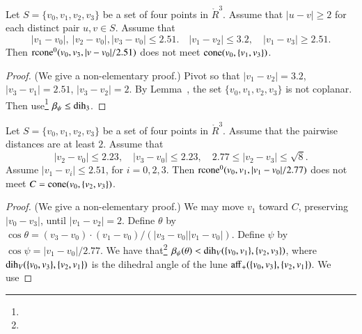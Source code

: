 \newpage

\begin{lemma}
 Let $S=\{v_0,v_1,v_2,v_3\}$ be a set of four points in $\ring{R}^3$.
Assume that $|u-v|\ge2$ for each distinct pair $u,v\in S$.  Assume
that 
  $$
    |v_1-v_0|,\ |v_2-v_0|, |v_3-v_0|\le 2.51.\quad 
    |v_1-v_2|\le 3.2,\quad |v_1-v_3|\ge 2.51.
   $$
Then ${\operatorname{rcone}}^0(v_0,v_3,|v-v_0|/2.51)$ does not meet
${\operatorname{cone}}(v_0,\{v_1,v_3\})$.
\end{lemma}


\begin{proof} (We give a non-elementary proof.)
Pivot so that $|v_1-v_2|=3.2$, $|v_3-v_1|=2.51$, $|v_3-v_2|=2$. 
By Lemma~, the
set $\{v_0,v_1,v_2,v_3\}$ is not coplanar. 
Then use\footnote{} %
 $\beta_\psi\le \operatorname{dih}_3$.
\end{proof}

\newpage


\begin{lemma}
Let $S=\{v_0,v_1,v_2,v_3\}$ be a set of four points in $\ring{R}^3$.
Assume that the pairwise distances are at least $2$.
Assume that
   $$
   |v_2-v_0|\le 2.23,\quad |v_3-v_0|\le 2.23,\quad 2.77\le |v_2-v_3|\le\sqrt8.
   $$
Assume $|v_1-v_i|\le 2.51$, for $i=0,2,3$.
Then ${\operatorname{rcone}}^0(v_0,v_1,|v_1-v_0|/2.77)$ does not meet
$C={\operatorname{cone}}(v_0,\{v_2,v_3\})$.
\end{lemma}


\begin{proof} (We give a non-elementary proof.)  We may
move $v_1$ toward $C$, preserving $|v_0-v_3|$, until $|v_1-v_2|=2$.
Define $\theta$ by $\cos\theta = (v_3-v_0)\cdot (v_1-v_0)/(|v_3-v_0||v_1-v_0|)$.
Define $\psi$ by $\cos\psi = |v_1-v_0|/2.77$.
We have that\footnote{}
    $\beta_\psi(\theta) < \operatorname{dih}_V(\{v_0,v_1\},\{v_2,v_3\})$,
where $\operatorname{dih}_V(\{v_0,v_3\},\{v_2,v_1\})$ is the dihedral angle 
of the lune ${\operatorname{aff}}_+(\{v_0,v_3\},\{v_2,v_1\})$.   We use
\end{proof}
\newpage

